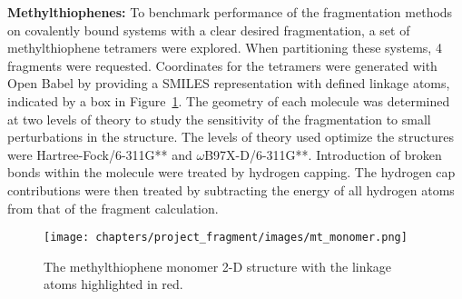 \noindent\textbf{Methylthiophenes: }To benchmark performance of the fragmentation methods on covalently bound systems with a clear desired fragmentation, a set of methylthiophene tetramers were explored. When partitioning these systems, 4 fragments were requested.
Coordinates for the tetramers were generated with Open Babel by providing a SMILES representation with defined linkage atoms, indicated by a box in Figure~\ref{fig:methylthiophene}.\autocite{OBoyle2011}
The geometry of each molecule was determined at two levels of theory to study the sensitivity of the fragmentation to small perturbations in the structure. 
The levels of theory used optimize the structures were Hartree-Fock/6-311G** and $\omega$B97X-D/6-311G**.\autocite{Chai2009, Chai2008} 
Introduction of broken bonds within the molecule were treated by hydrogen capping.
The hydrogen cap contributions were then treated by subtracting the energy of all hydrogen atoms from that of the fragment calculation. 

\begin{figure}[h!]
    \centering
    \texttt{[image: chapters/project\_fragment/images/mt\_monomer.png]}
    \caption[The methylthiophene monomer 2-D structure]{The methylthiophene monomer 2-D structure with the linkage atoms highlighted in red.}
    \label{fig:methylthiophene}
\end{figure}

